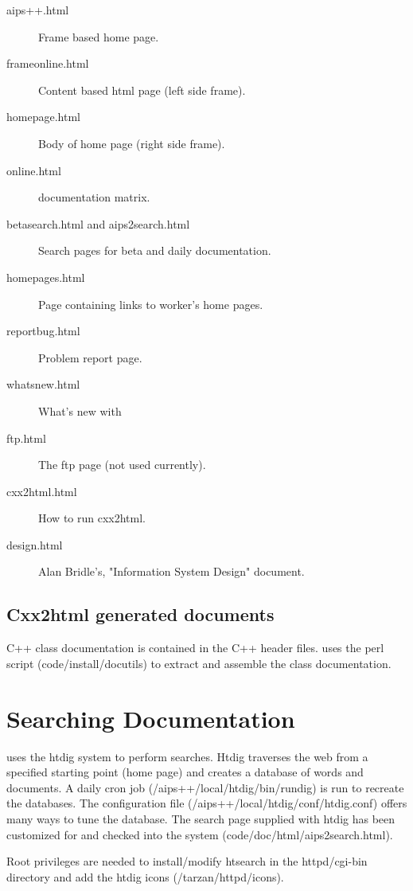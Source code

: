 \begin{description}
\item[aips++.html] Frame based \aips home page.
\item[frameonline.html] Content based html page (left side frame).
\item[homepage.html] Body of \aips home page (right side frame).
\item[online.html] \aips documentation matrix.
\item[betasearch.html and aips2search.html] Search pages for beta and daily documentation.
\item[homepages.html] Page containing links to \aips worker's home pages.
\item[reportbug.html] Problem report page.
\item[whatsnew.html] What's new with \aips
\item[ftp.html] The ftp page (not used currently).
\item[cxx2html.html] How to run cxx2html.
\item[design.html] Alan Bridle's, "\aips Information System Design" document. 
\end{description}


\subsection{Cxx2html generated documents}
C++ class documentation is contained in the C++ header files. \aips uses 
the perl script
 (code/install/docutils) to
extract and assemble the class documentation.

\section{Searching \aips Documentation}
\aips uses the htdig system  to perform searches.
Htdig traverses the web from a specified starting point (\aips home
page) and creates a database of words and documents.  A daily cron job
(/aips++/local/htdig/bin/rundig) is run
to recreate the databases.  The configuration file
(/aips++/local/htdig/conf/htdig.conf)
offers many ways to tune the database.  The search page supplied with
htdig has been customized for \aips and checked into the system
(code/doc/html/aips2search.html). 

Root privileges are needed to install/modify htsearch in the httpd/cgi-bin
directory and add the htdig icons (/tarzan/httpd/icons).

